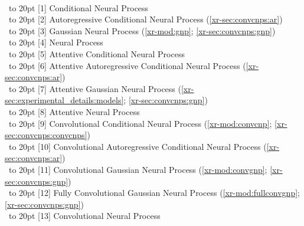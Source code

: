 \documentclass[12pt, twoside]{report}
\newcommand{\xrprefix}[1]{xr-#1}
\begin{document}
\begin{table}[t]
\begin{tabular}{llll}
            \\
        \bottomrule
    \end{tabular} \\[5pt]
    \begin{minipage}{.75\linewidth}
        \footnotesize\raggedright
        ~\hbox to 20pt {[1]} Conditional Neural Process \parencite{Garnelo:2018:Conditional_Neural_Processes} \\
        ~\hbox to 20pt {[2]} Autoregressive Conditional Neural Process (\cref{\xrprefix{sec:convcnps:ar}}) \\
        ~\hbox to 20pt {[3]} Gaussian Neural Process (\cref{\xrprefix{mod:gnp}}; \cref{\xrprefix{sec:convcnps:gnp}}) \\
        ~\hbox to 20pt {[4]} Neural Process \parencite{Garnelo:2018:Neural_Processes} \\
        ~\hbox to 20pt {[5]} Attentive Conditional Neural Process \parencite{Kim:2019:Attentive_Neural_Processes} \\
        ~\hbox to 20pt {[6]} Attentive Autoregressive Conditional Neural Process (\cref{\xrprefix{sec:convcnps:ar}}) \\
        ~\hbox to 20pt {[7]} Attentive Gaussian Neural Process (\cref{\xrprefix{sec:experimental_details:models}}; \cref{\xrprefix{sec:convcnps:gnp}}) \\
        ~\hbox to 20pt {[8]} Attentive Neural Process \parencite{Kim:2019:Attentive_Neural_Processes} \\
        ~\hbox to 20pt {[9]} Convolutional Conditional Neural Process (\cref{\xrprefix{mod:convcnp}}; \cref{\xrprefix{sec:convcnps:convcnps}}) \\
        ~\hbox to 20pt {[10]} Convolutional Autoregressive Conditional Neural Process (\cref{\xrprefix{sec:convcnps:ar}}) \\
        ~\hbox to 20pt {[11]} Convolutional Gaussian Neural Process (\cref{\xrprefix{mod:convgnp}}; \cref{\xrprefix{sec:convcnps:gnp}}) \\
        ~\hbox to 20pt {[12]} Fully Convolutional Gaussian Neural Process (\cref{\xrprefix{mod:fullconvgnp}}; \cref{\xrprefix{sec:convcnps:gnp}}) \\
        ~\hbox to 20pt {[13]} Convolutional Neural Process \parencite{Foong:2020:Meta-Learning_Stationary_Stochastic_Process_Prediction}
    \end{minipage}
\end{table}
\end{document}
